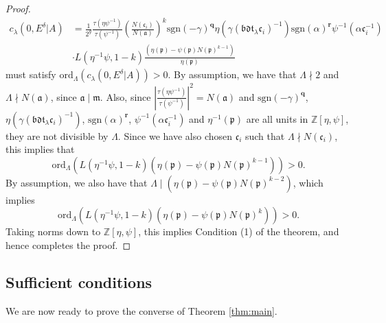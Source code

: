 \documentclass[a4paper,oneside]{amsart}
\theoremstyle{plain}
\theoremstyle{definition}
\begin{document}
\begin{proof}
     \begin{align*}
         c_{\lambda}(0,E^\delta|A) &= \frac{1}{2^g}\frac{\tau(\eta\psi^{-1})}{\tau(\psi^{-1})}\left(\frac{N(\mathfrak{c}_i)}{N(\mathfrak{a})}\right)^k\text{sgn}(-\gamma)^{\textbf{q}}\eta(\gamma(\mathfrak{bdt}_{\lambda}\mathfrak{c}_i)^{-1})\text{sgn}(\alpha)^{\textbf{r}}\psi^{-1}(\alpha\mathfrak{c}_i^{-1})\\ 
    &\cdot L(\eta^{-1}\psi,1-k)\frac{(\eta(\mathfrak{p}) - \psi(\mathfrak{p})N(\mathfrak{p})^{k-1})}{\eta(\mathfrak{p})}
     \end{align*}
must satisfy $\text{ord}_\Lambda(c_{\lambda}(0,E^\delta|A))>0.$ By assumption, we have that $\Lambda \nmid 2$ and $\Lambda \nmid N(\mathfrak{a})$, since $\mathfrak{a} \mid \mathfrak{m}$. Also, since $\left|\frac{\tau(\eta\psi^{-1})}{\tau(\psi^{-1})}\right|^2=N(\mathfrak{a})$ and $\text{sgn}(-\gamma)^{\textbf{q}}$, $\eta(\gamma(\mathfrak{bdt}_{\lambda}\mathfrak{c}_i)^{-1})$, $\text{sgn}(\alpha)^{\textbf{r}}$, $\psi^{-1}(\alpha\mathfrak{c}_i^{-1})$ and $\eta^{-1}(\mathfrak{p})$ are all units in $\mathbb{Z}[\eta, \psi]$, they are not divisible by $\Lambda$. Since we have also chosen $\mathfrak{c}_i$ such that $\Lambda \nmid N(\mathfrak{c}_i)$, this implies that
\begin{equation*}
    \text{ord}_\Lambda\left( L(\eta^{-1}\psi,1-k)(\eta(\mathfrak{p}) - \psi(\mathfrak{p})N(\mathfrak{p})^{k-1}) \right) >0.
\end{equation*}
By assumption, we also have that $\Lambda \mid  (\eta(\mathfrak{p}) - \psi(\mathfrak{p})N(\mathfrak{p})^{k-2})$, which implies
\begin{equation*}
    \text{ord}_\Lambda\left( L(\eta^{-1}\psi,1-k)(\eta(\mathfrak{p}) - \psi(\mathfrak{p})N(\mathfrak{p})^{k}) \right) >0.
\end{equation*}
Taking norms down to $\mathbb{Z}[\eta, \psi]$, this implies Condition (1) of the theorem, and hence completes the proof.
\end{proof}

\subsection{Sufficient conditions}
We are now ready to prove the converse of Theorem \ref{thm:main}.
\end{document}
